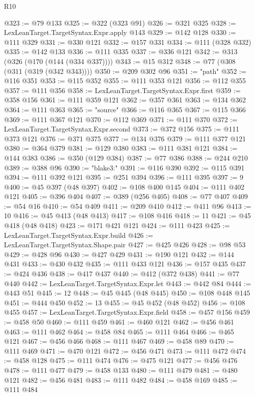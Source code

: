 \begin{lexlean}{R10}
\begin{coremodule}
@323 := @79 @133
@325 := @322 (@323 @91)
@326 := @321 @325
@328 := LexLeanTarget.TargetSyntax.Expr.apply @143
@329 := @142 @128
@330 := @111 @329
@331 := @330 @121
@332 := @157 @331
@334 := @111 (@328 @332)
@335 := @142 @133
@336 := @111 @335
@337 := @336 @121
@342 := @313 (@326 (@170 (@144 (@334 @337))))
@343 := @15 @312
@348 := @77 (@308 (@311 (@319 (@342 @343))))
@350 := @209 @302 @96
@351 := "path"
@352 := @116 @351
@353 := @115 @352
@355 := @111 @353 @121
@356 := @112 @355
@357 := @111 @356
@358 := LexLeanTarget.TargetSyntax.Expr.first
@359 := @358 @156
@361 := @111 @359 @121
@362 := @357 @361
@363 := @134 @362
@364 := @111 @363
@365 := "source"
@366 := @116 @365
@367 := @115 @366
@369 := @111 @367 @121
@370 := @112 @369
@371 := @111 @370
@372 := LexLeanTarget.TargetSyntax.Expr.second
@373 := @372 @156
@375 := @111 @373 @121
@376 := @371 @375
@377 := @134 @376
@379 := @111 @377 @121
@380 := @364 @379
@381 := @129 @380
@383 := @111 @381 @121
@384 := @144 @383
@386 := @350 (@129 @384)
@387 := @77 @386
@388 := @244 @210
@389 := @388 @96
@390 := "blake3:"
@391 := @116 @390
@392 := @115 @391
@394 := @111 @392 @121
@395 := @251 @394
@396 := @111 @395
@397 := 9
@400 := @45 @397 (@48 @397)
@402 := @108 @400 @145
@404 := @111 @402 @121
@405 := @396 @404
@407 := @389 (@256 @405)
@408 := @77 @407
@409 := @54 @16
@410 := @54 @409
@411 := @209 @410
@412 := @411 @96
@413 := 10
@416 := @45 @413 (@48 @413)
@417 := @108 @416
@418 := 11
@421 := @45 @418 (@48 @418)
@423 := @171 @421 @121
@424 := @111 @423
@425 := LexLeanTarget.TargetSyntax.Expr.build
@426 := LexLeanTarget.TargetSyntax.Shape.pair
@427 := @425 @426
@428 := @98 @53
@429 := @428 @96
@430 := @427 @429
@431 := @190 @121
@432 := @144 @431
@433 := @430 @432
@435 := @111 @433 @121
@436 := @157 @435
@437 := @424 @436
@438 := @417 @437
@440 := @412 (@372 @438)
@441 := @77 @440
@442 := LexLeanTarget.TargetSyntax.Expr.let
@443 := @442 @84
@444 := @443 @51
@445 := 12
@448 := @45 @445 (@48 @445)
@450 := @108 @448 @145
@451 := @444 @450
@452 := 13
@455 := @45 @452 (@48 @452)
@456 := @108 @455
@457 := LexLeanTarget.TargetSyntax.Expr.field
@458 := @457 @156
@459 := @458 @50
@460 := @111 @459
@461 := @460 @121
@462 := @456 @461
@463 := @111 @462
@464 := @458 @84
@465 := @111 @464
@466 := @465 @121
@467 := @456 @466
@468 := @111 @467
@469 := @458 @89
@470 := @111 @469
@471 := @470 @121
@472 := @456 @471
@473 := @111 @472
@474 := @458 @128
@475 := @111 @474
@476 := @475 @121
@477 := @456 @476
@478 := @111 @477
@479 := @458 @133
@480 := @111 @479
@481 := @480 @121
@482 := @456 @481
@483 := @111 @482
@484 := @458 @169
@485 := @111 @484

\end{coremodule}
\end{lexlean}
